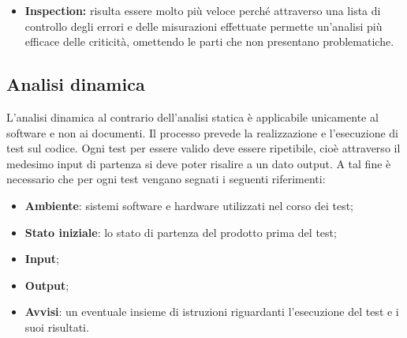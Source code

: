 \begin{itemize}
\begin{itemize}
\item \textbf{Inspection:} risulta essere molto più veloce perché attraverso una lista di controllo degli
errori e delle misurazioni effettuate permette un'analisi più efficace delle
criticità, omettendo le parti che non presentano problematiche.
\end{itemize}
	
\subsection{Analisi dinamica}	L'analisi dinamica al contrario dell'analisi statica è applicabile unicamente
al software e non ai documenti. Il processo prevede la realizzazione e l'esecuzione
di test sul codice. Ogni test per essere valido deve essere ripetibile,
cioè attraverso il medesimo input di partenza si deve poter risalire a un dato
output. A tal fine è necessario che per ogni test vengano segnati i seguenti
riferimenti:

\begin{itemize}
	\item \textbf{Ambiente}: sistemi software e hardware utilizzati nel corso dei
	test;
	\item \textbf{Stato iniziale}: lo stato di partenza del prodotto prima del test;
	\item \textbf{Input};
	\item \textbf{Output};
	\item \textbf{Avvisi}: un eventuale insieme di istruzioni riguardanti l'esecuzione del
test e i suoi risultati.

\end{itemize}


\end{itemize}
